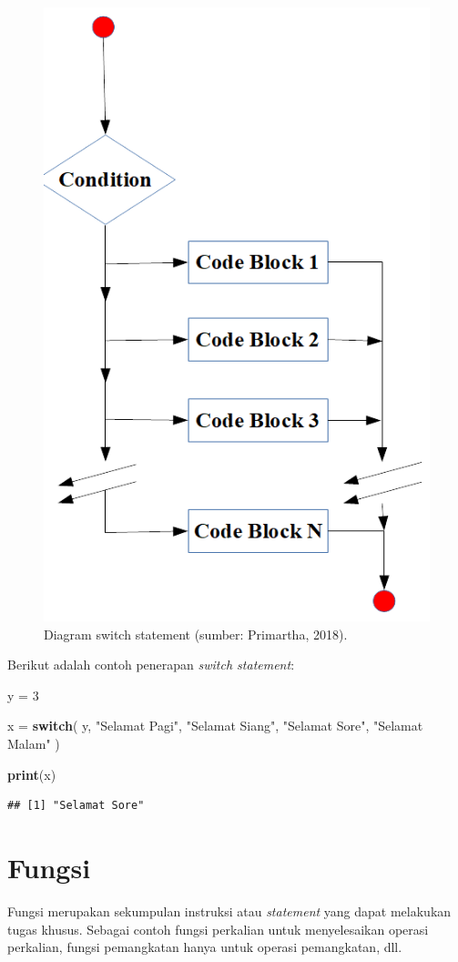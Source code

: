 \documentclass[]{book}
\newenvironment{Shaded}{\begin{snugshade}}{\end{snugshade}}
\newcommand{\KeywordTok}[1]{\textcolor[rgb]{0.13,0.29,0.53}{\textbf{#1}}}
\newcommand{\DecValTok}[1]{\textcolor[rgb]{0.00,0.00,0.81}{#1}}
\newcommand{\StringTok}[1]{\textcolor[rgb]{0.31,0.60,0.02}{#1}}
\newcommand{\ControlFlowTok}[1]{\textcolor[rgb]{0.13,0.29,0.53}{\textbf{#1}}}
\newcommand{\NormalTok}[1]{#1}
\begin{document}
\begin{figure}

{\centering \includegraphics[width=0.4\linewidth]{switch} 

}

\caption{Diagram switch statement (sumber: Primartha, 2018).}\label{fig:switch}
\end{figure}

Berikut adalah contoh penerapan \emph{switch statement}:

\begin{Shaded}
\begin{Highlighting}[]
\NormalTok{y =}\StringTok{ }\DecValTok{3}

\NormalTok{x =}\StringTok{ }\ControlFlowTok{switch}\NormalTok{(}
\NormalTok{  y,}
  \StringTok{"Selamat Pagi"}\NormalTok{,}
  \StringTok{"Selamat Siang"}\NormalTok{,}
  \StringTok{"Selamat Sore"}\NormalTok{,}
  \StringTok{"Selamat Malam"}
\NormalTok{)}

\KeywordTok{print}\NormalTok{(x)}
\end{Highlighting}
\end{Shaded}

\begin{verbatim}
## [1] "Selamat Sore"
\end{verbatim}

\section{Fungsi}\label{fungsi}

Fungsi merupakan sekumpulan instruksi atau \emph{statement} yang dapat
melakukan tugas khusus. Sebagai contoh fungsi perkalian untuk
menyelesaikan operasi perkalian, fungsi pemangkatan hanya untuk operasi
pemangkatan, dll.
\end{document}
